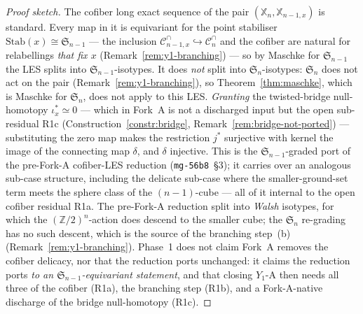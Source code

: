 \documentclass[11pt,oneside]{amsart}
\theoremstyle{plain}
\theoremstyle{definition}
\theoremstyle{remark}
\theoremstyle{honeststyle}
\newcommand{\Sym}{\mathfrak{S}}
\newcommand{\Z}{\mathbb{Z}}
\newcommand{\Cn}{\mathcal{C}^{\cap}_n}
\newcommand{\Cnm}{\mathcal{C}^{\cap}_{n-1,x}}
\newcommand{\Xbb}{\mathbb{X}}
\begin{document}
\begin{proof}[Proof sketch]
The cofiber long exact sequence of the pair $(\Xbb_n,\Xbb_{n-1,x})$ is
standard. Every map in it is equivariant for the point stabiliser
$\mathrm{Stab}(x)\cong\Sym_{n-1}$ --- the inclusion
$\Cnm\hookrightarrow\Cn$ and the cofiber are natural for relabellings
\emph{that fix $x$} (Remark~\ref{rem:y1-branching}) --- so by Maschke
for $\Sym_{n-1}$ the LES splits into $\Sym_{n-1}$-isotypes. It does
\emph{not} split into $\Sym_n$-isotypes: $\Sym_n$ does not act on the
pair (Remark~\ref{rem:y1-branching}), so Theorem~\ref{thm:maschke},
which is Maschke for $\Sym_n$, does not apply to this LES.
\emph{Granting} the twisted-bridge null-homotopy $\iota_x^{*}\simeq0$
--- which in Fork~A is not a discharged input but the open
sub-residual R1c (Construction~\ref{constr:bridge},
Remark~\ref{rem:bridge-not-ported}) --- substituting the zero map
makes the restriction $j^{*}$ surjective with kernel the image of the
connecting map $\delta$, and $\delta$ injective. This is the
$\Sym_{n-1}$-graded port of the pre-Fork-A cofiber-LES reduction
(\texttt{mg-56b8}~\S3); it carries over an analogous sub-case
structure, including the delicate sub-case where the
smaller-ground-set term meets the sphere class of the $(n-1)$-cube ---
all of it internal to the open cofiber residual R1a. The pre-Fork-A
reduction split into \emph{Walsh} isotypes, for which the
$(\Z/2)^n$-action does descend to the smaller cube; the $\Sym_n$
re-grading has no such descent, which is the source of the branching
step~(b) (Remark~\ref{rem:y1-branching}). Phase~1 does not claim
Fork~A removes the cofiber delicacy, nor that the reduction ports
unchanged: it
claims the reduction ports \emph{to an $\Sym_{n-1}$-equivariant
statement}, and that closing $Y_1$-A then needs all three of the
cofiber (R1a), the branching step (R1b), and a Fork-A-native
discharge of the bridge null-homotopy (R1c).
\end{proof}
\end{document}
